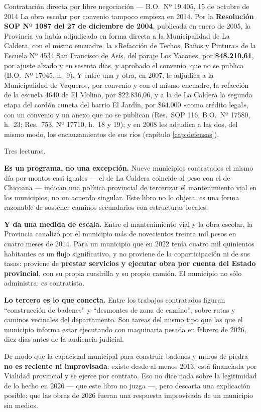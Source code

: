 \begin{ficha}{Contratación directa por libre negociación --- B.O.\ Nº 19.405, 15 de octubre de 2014}
La obra escolar por convenio tampoco empieza en 2014. Por la \textbf{Resolución SOP Nº 1087 del 27 de diciembre de 2004}, publicada en enero de 2005, la Provincia ya había adjudicado en forma directa a la Municipalidad de La Caldera, con el mismo encuadre, la «Refacción de Techos, Baños y Pintura» de la Escuela Nº 4534 San Francisco de Asís, del paraje Los Yacones, por \textbf{\$48.210,61}, por ajuste alzado y en sesenta días, y aprobado el convenio, que no se publica (B.O.\ Nº 17045, h.\ 9). Y entre una y otra, en 2007, le adjudica a la Municipalidad de Vaqueros, por convenio y con el mismo encuadre, la refacción de la escuela 4640 de El Molino, por \$22.836,06, y a la de La Caldera la segunda etapa del cordón cuneta del barrio El Jardín, por \$64.000 «como crédito legal», con un convenio y un anexo que no se publican (Res.\ SOP 116, B.O.\ Nº 17580, h.\ 23; Res.\ 753, Nº 17710, h.\ 18 y 19); y en 2008 les adjudica a las dos, del mismo modo, los encauzamientos de sus ríos (capítulo \ref{cap:defensas}).
\end{ficha}

\begin{cautela}
Tres lecturas.

\textbf{Es un programa, no una excepción.} Nueve municipios contratados el mismo día por montos casi iguales --- el de La Caldera coincide al peso con el de Chicoana --- indican una política provincial de tercerizar el mantenimiento vial en los municipios, no un acuerdo singular. Este libro no lo objeta: es una forma razonable de sostener caminos secundarios con estructuras locales.

\textbf{Y da una medida de escala.} Entre el mantenimiento vial y la obra escolar, la Provincia canalizó por el municipio más de novecientos treinta mil pesos en cuatro meses de 2014. Para un municipio que en 2022 tenía cuatro mil quinientos habitantes es un flujo significativo, y no proviene de la coparticipación ni de sus tasas: proviene de \textbf{prestar servicios y ejecutar obra por cuenta del Estado provincial}, con su propia cuadrilla y su propio camión. El municipio no sólo administra: es contratista.

\textbf{Lo tercero es lo que conecta.} Entre los trabajos contratados figuran ``construcción de badenes'' y ``desmontes de zona de camino'', sobre rutas y caminos vecinales del departamento. Son tareas del mismo tipo que las que el municipio informa estar ejecutando con maquinaria pesada en febrero de 2026, diez días antes de la audiencia judicial.

De modo que la capacidad municipal para construir badenes y muros de piedra \textbf{no es reciente ni improvisada}: existe desde al menos 2013, está financiada por Vialidad provincial y se ejerce por contrato. Eso no dice nada sobre la legitimidad de lo hecho en 2026 --- que este libro no juzga ---, pero descarta una explicación posible: que las obras de 2026 fueran una respuesta improvisada de un municipio sin medios.
\end{cautela}


